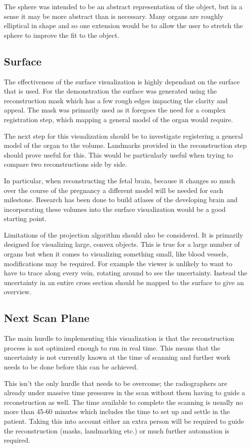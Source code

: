 The sphere was intended to be an abstract representation of the object, but in a sense it may be more abstract than is necessary. Many organs are roughly elliptical in shape and so one extension would be to allow the user to stretch the sphere to improve the fit to the object.

\subsection*{Surface}
The effectiveness of the surface visualization is highly dependant on the surface that is used. For the demonstration the surface was generated using the reconstruction mask which has a few rough edges impacting the clarity and appeal. The mask was primarily used as it foregoes the need for a complex registration step, which mapping a general model of the organ would require.

The next step for this visualization should be to investigate registering a general model of the organ to the volume. Landmarks provided in the reconstruction step should prove useful for this. This would be particularly useful when trying to compare two reconstructions side by side.

In particular, when reconstructing the fetal brain, because it changes so much over the course of the pregnancy a different model will be needed for each milestone. Research has been done to build atlases of the developing brain\cite{fetalatlas} and incorporating these volumes into the surface visualization would be a good starting point.

Limitations of the projection algorithm should also be considered. It is primarily designed for visualizing large, convex objects. This is true for a large number of organs but when it comes to visualizing something small, like blood vessels, modifications may be required. For example the viewer is unlikely to want to have to trace along every vein, rotating around to see the uncertainty. Instead the uncertainty in an entire cross section should be mapped to the surface to give an overview.

\subsection*{Next Scan Plane}
The main hurdle to implementing this visualization is that the reconstruction process is not optimized enough to run in real time. This means that the uncertainty is not currently known at the time of scanning and further work needs to be done before this can be achieved.

This isn't the only hurdle that needs to be overcome; the radiographers are already under massive time pressures in the scan without them having to guide a reconstruction as well. The time available to complete the scanning is usually no more than 45-60 minutes which includes the time to set up and settle in the patient. Taking this into account either an extra person will be required to guide the reconstruction (masks, landmarking etc.) or much further automation is required.